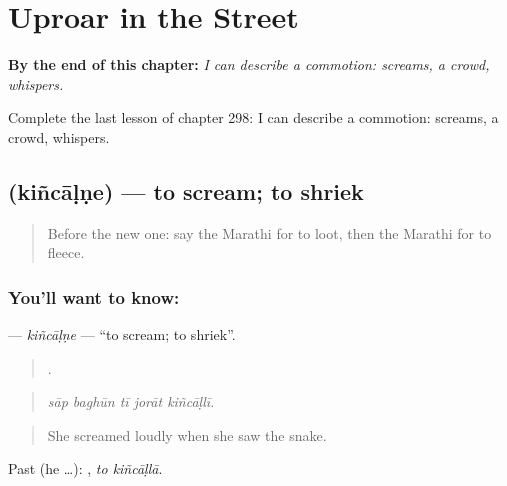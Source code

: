
\chapter{Uproar in the Street}
\label{ch:mr-uproar-in-the-street}

\begin{chapteropening}
\textbf{By the end of this chapter:} \emph{I can describe a commotion: screams, a crowd, whispers.}

Complete the last lesson of chapter 298: I can describe a commotion: screams, a crowd, whispers.
\end{chapteropening}

\section[\texorpdfstring{\mr{किंचाळणे} (kiñcāḷṇe)}{किंचाळणे (kiñcāḷṇe)}]{ (kiñcāḷṇe) — to scream; to shriek}

\label{lesson:MR-C298-kincalne}



\begin{quote}
Before the new one: say the Marathi for to loot, then the Marathi for to fleece.
\end{quote}

\subsection*{You'll want to know: }
\textbf{} — \emph{kiñcāḷṇe} — \textquotedblleft{}to scream; to shriek\textquotedblright{}.

\begin{quote}
    .
\end{quote}

\begin{quote}
\emph{sāp baghūn tī jorāt kiñcāḷlī.}
\end{quote}

\begin{quote}
She screamed loudly when she saw the snake.
\end{quote}

Past (he …):  , \emph{to kiñcāḷlā}.


